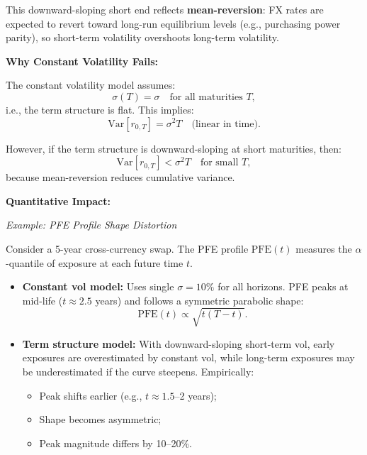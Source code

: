 This downward-sloping short end reflects \textbf{mean-reversion}: FX rates are expected to revert toward long-run equilibrium levels (e.g., purchasing power parity), so short-term volatility overshoots long-term volatility.

\textbf{Why Constant Volatility Fails:}

The constant volatility model assumes:
\begin{equation}
	\sigma(T) = \sigma \quad \text{for all maturities } T,
\end{equation}
i.e., the term structure is flat. This implies:
\begin{equation}
	\text{Var}[r_{0,T}] = \sigma^2 T \quad \text{(linear in time)}.
\end{equation}

However, if the term structure is downward-sloping at short maturities, then:
\begin{equation}
	\text{Var}[r_{0,T}] < \sigma^2 T \quad \text{for small } T,
\end{equation}
because mean-reversion reduces cumulative variance.

\textbf{Quantitative Impact:}

\textit{Example: PFE Profile Shape Distortion}

Consider a 5-year cross-currency swap. The PFE profile $\text{PFE}(t)$ measures the $\alpha$-quantile of exposure at each future time $t$.

\begin{itemize}
	\item \textbf{Constant vol model:} Uses single $\sigma = 10\%$ for all horizons. PFE peaks at mid-life ($t \approx 2.5$ years) and follows a symmetric parabolic shape:
	\begin{equation}
		\text{PFE}(t) \propto \sqrt{t(T-t)}.
	\end{equation}
	
	\item \textbf{Term structure model:} With downward-sloping short-term vol, early exposures are overestimated by constant vol, while long-term exposures may be underestimated if the curve steepens. Empirically:
	\begin{itemize}
		\item Peak shifts earlier (e.g., $t \approx 1.5$--2 years);
		\item Shape becomes asymmetric;
		\item Peak magnitude differs by 10--20\%.
	\end{itemize}
\end{itemize}

